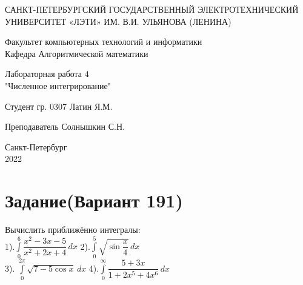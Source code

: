 \documentclass[12pt,a4paper]{article}
\begin{document}
	
	\begin{titlepage}
		
		\begin{center}
			САНКТ-ПЕТЕРБУРГСКИЙ ГОСУДАРСТВЕННЫЙ ЭЛЕКТРОТЕХНИЧЕСКИЙ УНИВЕРСИТЕТ «ЛЭТИ» ИМ. В.И. УЛЬЯНОВА (ЛЕНИНА)\\
			\vspace{0.1cm}
			
			
			
			
		\end{center}
	\vspace{2cm}
	\begin{center}
		\begin{large}
			Факультет компьютерных технологий и информатики\\
			Кафедра Алгоритмической математики\\
		\end{large}
	\end{center}
		
		\vspace{5cm}
		\begin{center}
			\begin{large}
				Лабораторная работа 4 \\
				"Численное интегрирование"
			\end{large}
		\end{center}
		
		\vspace{5cm}
		
		\hspace{5cm} Студент гр.  0307 \hrulefill Латин Я.М.
		
		\vspace{0.5cm}
		\hspace{5cm} Преподаватель \hrulefill Солнышкин С.Н. \\
		
		
		\vfill
		\begin{center}
			Санкт-Петербург\\
			2022
		\end{center}
		
	\end{titlepage}
	\tableofcontents
	\newpage
	\section{Задание(Вариант 191)}
	Вычислить приближённо интегралы:\\
	1).$\displaystyle\int\limits_0^6 \dfrac{x^2-3x-5}{x^2+2x+4}\,dx$
	\hspace{4cm}
	2).$\displaystyle\int\limits_0^5 \sqrt{\sin\dfrac{x}{4}}\,dx$\\
	3). $\displaystyle\int\limits_0^{2\pi} \sqrt{7-5\cos x}\,dx$
	\hspace{3.75cm}
	4).$\displaystyle \int \limits_0^\infty \dfrac{5+3x}{1+2x^5+4x^6}\,dx$
	
\end{document}
